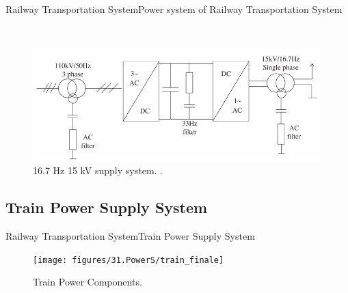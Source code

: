 \begin{frame}{Railway Transportation System}{Power system of Railway Transportation System}
\begin{minipage}[t]{0.48\linewidth}
	
\end{minipage}

\begin{minipage}[t]{0.24\linewidth} ~ \end{minipage}
\begin{minipage}[t]{0.48\linewidth}

\begin{figure}[ht!]
	\centering
	\includegraphics[width=\textwidth,keepaspectratio]{figures/31.PowerS/abad2016e}
	\caption{16.7 Hz 15 kV supply system. \cite{abad2016}.}
\end{figure}
\end{minipage}

\end{frame}

\subsection{Train Power Supply System}

\begin{frame}{Railway Transportation System}{Train Power Supply System}


\begin{figure}[h!]
	\centering
	\texttt{[image: figures/31.PowerS/train\_finale]}
	\caption{Train Power Components.}
	\label{fig:abad2016}
\end{figure}


\end{frame}

